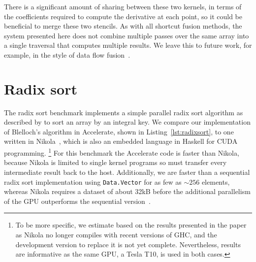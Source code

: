 There is a significant amount of sharing between these two kernels, in terms of
the coefficients required to compute the derivative at each point, so it could
be beneficial to merge these two stencils. As with all shortcut fusion methods,
the system presented here does not combine multiple passes over the same array
into a single traversal that computes multiple results. We leave this to future
work, for example, in the style of data flow fusion~\cite{Lippmeier:2013vz}.


\section{Radix sort}

The radix sort benchmark implements a simple parallel radix sort algorithm as
described by \citet{Blelloch:1990vl} to sort an array by an integral key. We
compare our implementation of Blelloch's algorithm in Accelerate, shown in
Listing~\ref{lst:radixsort}, to one written in Nikola~\cite{Mainland:2010vj},
which is also an embedded language in Haskell for CUDA programming.%
\footnote{To be more specific, we estimate based on the results presented in the
paper~\cite{Mainland:2010vj} as Nikola no longer compiles with recent versions
of GHC, and the development version to replace it is not yet complete.
Nevertheless, results are informative as the same GPU, a Tesla T10, is used in
both cases.}
For this benchmark the Accelerate code is faster than Nikola, because Nikola is
limited to single kernel programs so must transfer every intermediate result
back to the host. Additionally, we are faster than a sequential radix sort
implementation using \texttt{Data.Vector} for as few as $\sim256$ elements,
whereas Nikola requires a dataset of about 32kB before the additional
parallelism of the GPU outperforms the sequential
version~\cite{Mainland:2010vj}.

